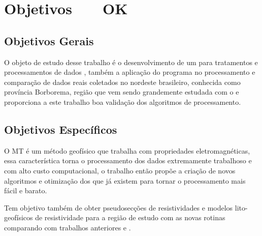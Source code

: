 
\chapter{Objetivos \, \,\,\,\,\, OK}
\label{cap-objetivos}

\section{Objetivos Gerais}
\label{cap-objetivos gerais}

    
    O objeto de estudo desse trabalho é o desenvolvimento de um  para tratamentos e processamentos de dados \MT, também a aplicação do programa no processamento e comparação de dados reais coletados no nordeste brasileiro, conhecida como província Borborema, região que vem sendo grandemente estudada com o \MT e proporciona a este trabalho boa validação dos algoritmos de processamento.

\section{Objetivos Específicos}
\label{cap-objetivos especificos}

    O MT é um método geofísico que trabalha com propriedades eletromagnéticas, essa característica torna o processamento dos dados extremamente trabalhoso e com alto custo computacional, o trabalho então propõe a criação de novos algoritmos e otimização dos que já existem para tornar o processamento mais fácil e barato.
    
    Tem objetivo também de obter pseudosecções de resistividades e modelos lito-geofísicos de resistividade para a região de estudo com as novas rotinas comparando com trabalhos anteriores \cite{tese_andrea} e \cite{alane}.
